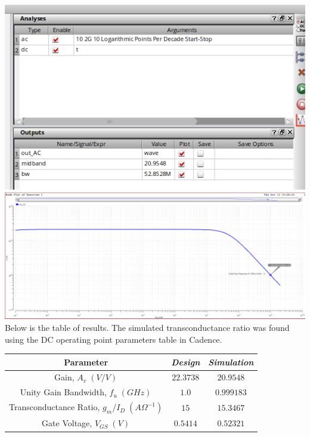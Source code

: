 \documentclass[12pt, fleqn]{article}
\begin{document}
\includegraphics[scale=0.5, center]{sim_res1.PNG}\\[0.25cm]
\includegraphics[scale=0.25, center]{bode1.PNG}\\[0.25cm]
Below is the table of results.  The simulated transconductance ratio was found using the DC operating point parameters table in Cadence.\\[0.25cm]
    \begin{table}[H]
    \centering
    \setlength{\tabcolsep}{20pt}
    \renewcommand{\arraystretch}{1.5}
        \begin{tabular}{|c|c|c|}
            \hline
            \textbf{Parameter} & \textit{Design} & \textit{Simulation}\\
            \hline
            Gain, $A_v\;(V/V)$ & $22.3738$ & $20.9548$\\
            \hline
            Unity Gain Bandwidth, $f_u\;(GHz)$ & $1.0$ & $0.999183$\\
            \hline
            Transconductance Ratio, $g_m / I_D\;({A\Omega}^{-1})$ & $15$ & $15.3467$\\
            \hline
            Gate Voltage, $V_{GS}\;(V)$ & $0.5414$ & $0.52321$\\
            \hline
        \end{tabular}
    \end{table}
\newpage
\end{document}
